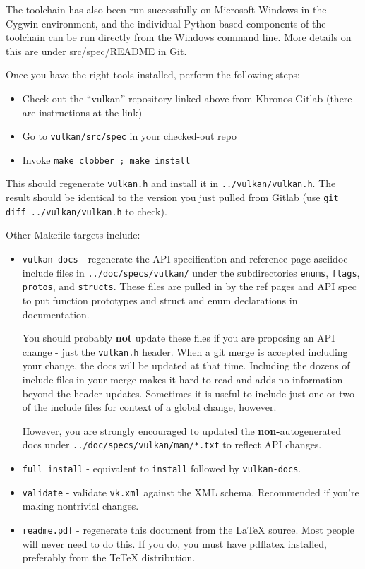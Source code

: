 \documentclass{article}
\def\code#1{{\tt #1}}
\begin{document}
The toolchain has also been run successfully on Microsoft Windows in the
Cygwin environment, and the individual Python-based components of the
toolchain can be run directly from the Windows command line. More details on
this are under src/spec/README in Git.

Once you have the right tools installed, perform the following steps:

\begin{itemize}
\item Check out the ``vulkan'' repository linked above from Khronos Gitlab
      (there are instructions at the link)
\item Go to \code{vulkan/src/spec} in your checked-out repo
\item Invoke \code{make clobber ; make install}
\end{itemize}

This should regenerate \code{vulkan.h} and install it in
\code{../vulkan/vulkan.h}. The result should be identical to the
version you just pulled from Gitlab (use \code{git diff
../vulkan/vulkan.h} to check).

Other Makefile targets include:

\begin{itemize}
\item \code{vulkan-docs} - regenerate the API specification and reference
      page asciidoc include files in \code{../doc/specs/vulkan/} under the
      subdirectories \code{enums}, \code{flags}, \code{protos}, and
      \code{structs}. These files are pulled in by the ref pages and API
      spec to put function prototypes and struct and enum declarations in
      documentation.

      You should probably {\bf not} update these files if you are proposing
      an API change - just the \code{vulkan.h} header. When a git merge is
      accepted including your change, the docs will be updated at that time.
      Including the dozens of include files in your merge makes it hard to
      read and adds no information beyond the header updates. Sometimes it
      is useful to include just one or two of the include files for context
      of a global change, however.

      However, you are strongly encouraged to updated the {\bf
      non-}autogenerated docs under \code{../doc/specs/vulkan/man/*.txt} to
      reflect API changes.
\item \code{full_install} - equivalent to \code{install} followed by
      \code{vulkan-docs}.
\item \code{validate} - validate \code{vk.xml} against the XML schema.
      Recommended if you're making nontrivial changes.
\item \code{readme.pdf} - regenerate this document from the LaTeX source.
      Most people will never need to do this. If you do, you must have
      pdflatex installed, preferably from the TeTeX distribution.
\end{itemize}
\end{document}
